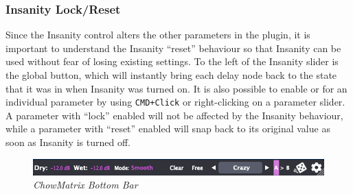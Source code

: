 \documentclass[landscape,twocolumn,a5paper]{manual}
\newcommand\shortcut[1]{\colorbox{highlightcolour}{\texttt{#1}}}
\begin{document}
\subsubsection{Insanity Lock/Reset}
Since the Insanity control alters the other parameters
in the plugin, it is important to understand the Insanity
``reset'' behaviour so that Insanity can be used without
fear of losing existing settings. To the left of the
Insanity slider is the global 
button, which will instantly bring each delay node back
to the state that it was in when Insanity was turned on.
\newpar
It is also possible to enable  or
 for an individual parameter by using
\shortcut{CMD+Click} or right-clicking on a parameter
slider. A parameter with ``lock'' enabled will not be
affected by the Insanity behaviour, while a parameter with
``reset'' enabled will snap back to its original value as
soon as Insanity is turned off.

\begin{figure}[ht]
    \center
    \includegraphics[width=0.95\columnwidth]{screenshots/BottomBar.png}
    \caption{\label{fig:bottom_bar}{\it ChowMatrix Bottom Bar}}
\end{figure}
\end{document}
